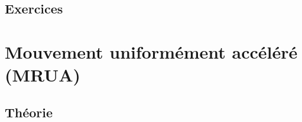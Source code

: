 \subsection{Exercices}

 
\section{Mouvement uniformément accéléré (MRUA)}		\label{SecMRUA}

\subsection{Théorie}

